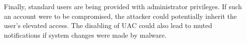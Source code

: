 Finally, standard users are being provided with administrator privileges. If such an account were to be compromised, the attacker could potentially inherit the user's elevated access. The disabling of UAC could also lead to muted notifications if system changes were made by malware.


